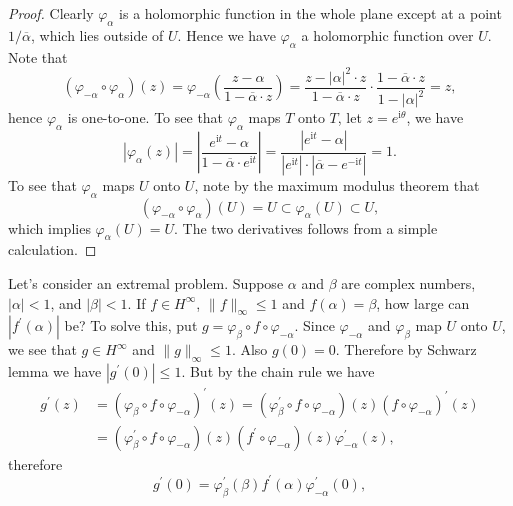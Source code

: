 \begin{proof}
Clearly $\varphi_\alpha$ is a holomorphic function in the whole plane except at a point $1/\overline{\alpha}$, which lies outside of $U$. Hence we have $\varphi_\alpha$ a holomorphic function over $U$. Note that 
$$
\left( \varphi _{-\alpha}\circ \varphi _{\alpha} \right) \left( z \right) =\varphi _{-\alpha}\left( \frac{z-\alpha}{1-\overline{\alpha }\cdot z} \right) =\frac{z-\left| \alpha \right|^2\cdot z}{1-\overline{\alpha }\cdot z}\cdot \frac{1-\overline{\alpha }\cdot z}{1-\left| \alpha \right|^2}=z,
$$
hence $\varphi_\alpha$ is one-to-one. To see that $\varphi_\alpha$ maps $T$ onto $T$, let $z=e^{\mathrm{i}\theta}$, we have 
$$
\left| \varphi _{\alpha}\left( z \right) \right|=\left| \frac{e^{\mathrm{i}t}-\alpha}{1-\overline{\alpha }\cdot e^{\mathrm{i}t}} \right|=\frac{\left| e^{\mathrm{i}t}-\alpha \right|}{\left| e^{\mathrm{i}t} \right|\cdot \left| \overline{\alpha }-e^{-\mathrm{i}t} \right|}=1.
$$
To see that $\varphi_\alpha$ maps $U$ onto $U$, note by the maximum modulus theorem that 
$$
\left( \varphi _{-\alpha}\circ \varphi _{\alpha} \right) \left( U \right) =U\subset \varphi _{\alpha}\left( U \right) \subset U,
$$
which implies $\varphi_\alpha(U)=U$. The two derivatives follows from a simple calculation.
\end{proof}
Let's consider an extremal problem. Suppose $\alpha$ and $\beta$ are complex numbers, $|\alpha|<1$, and $|\beta|<1$. If $f\in H^\infty$, $\|f\|_\infty\le 1$ and $f(\alpha)=\beta$, how large can $|f^\prime(\alpha)|$ be? To solve this, put $g=\varphi_\beta\circ f\circ\varphi_{-\alpha}$. Since $\varphi_{-\alpha}$ and $\varphi_\beta$ map $U$ onto $U$, we see that $g\in H^\infty$ and $\|g\|_\infty\le 1$. Also $g(0)=0$. Therefore by Schwarz lemma we have $|g^\prime(0)|\le 1$. But by the chain rule we have 
$$
\begin{aligned}
g^{\prime}\left( z \right) &=\left( \varphi _{\beta}\circ f\circ \varphi _{-\alpha} \right) ^{\prime}\left( z \right) =\left( \varphi _{\beta}^{\prime}\circ f\circ \varphi _{-\alpha} \right) \left( z \right) \left( f\circ \varphi _{-\alpha} \right) ^{\prime}\left( z \right) 
\\
&=\left( \varphi _{\beta}^{\prime}\circ f\circ \varphi _{-\alpha} \right) \left( z \right) \left( f^{\prime}\circ \varphi _{-\alpha} \right) \left( z \right) \varphi _{-\alpha}^{\prime}\left( z \right) ,
\end{aligned}
$$
therefore 
$$
g^{\prime}\left( 0 \right) =\varphi _{\beta}^{\prime}\left( \beta \right) f^{\prime}\left( \alpha \right) \varphi _{-\alpha}^{\prime}\left( 0 \right) ,
$$
